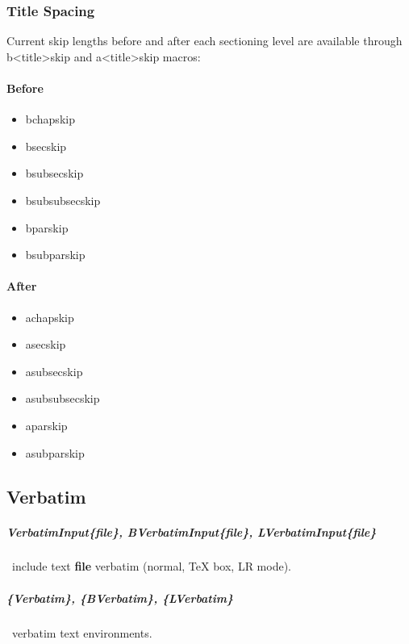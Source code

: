 \documentclass[english,12pt,openany,letterpaper]{book}
\begin{document}
\vspace*{-4ex}
\linefill

\subsubsection{Title Spacing}

Current skip lengths before and after each sectioning level are available through \bs b<title>skip and \bs a<title>skip macros:

\vspace*{-2ex}
\begin{multicols}{2}
	\paragraph{Before}
	\begin{itemize}
		\item \bs bchapskip
		\item \bs bsecskip
		\item \bs bsubsecskip
		\item \bs bsubsubsecskip
		\item \bs bparskip
		\item \bs bsubparskip
	\end{itemize}
	\columnbreak
	\paragraph{After}
	\begin{itemize}
		\item \bs achapskip
		\item \bs asecskip
		\item \bs asubsecskip
		\item \bs asubsubsecskip
		\item \bs aparskip
		\item \bs asubparskip
	\end{itemize}
\end{multicols}


\subsection{Verbatim}

\subparagraph{\bs VerbatimInput\{file\}, \bs BVerbatimInput\{file\}, \bs LVerbatimInput\{file\}} \dash\ include text \textbf{file} verbatim (normal, TeX box, LR mode).

\subparagraph{\{Verbatim\}, \{BVerbatim\}, \{LVerbatim\}} \dash\ verbatim text environments.
\end{document}
